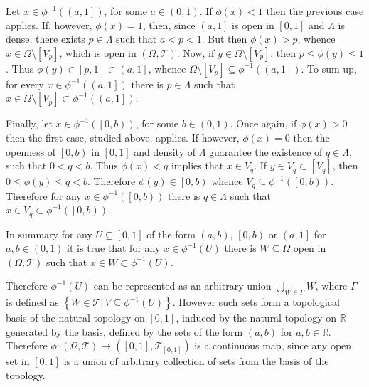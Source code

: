 \documentclass[a4paper]{article}
\newcommand{\obj}[1]{\left\{ #1 \right \}}
\newcommand{\clo}[1]{\left [ #1 \right ]}
\newcommand{\clop}[1]{\left [ #1 \right )}
\newcommand{\ploc}[1]{\left ( #1 \right ]}
\newcommand{\brac}[1]{\left ( #1 \right )}
\newcommand{\induc}[1]{\left . #1 \right \vert}
\newcommand{\Real}{\mathbb{R}}
\newcommand{\Tcal}{\mathcal{T}}
\begin{document}
Let $x\in \phi^{-1}\brac{\ploc{a,1}}$, for some $a\in \brac{0,1}$. If $\phi\brac{x}<1$ then the previous case applies. If, however, $\phi\brac{x} = 1$, then, since $\ploc{a,1}$ is open in $\clo{0,1}$ and $\Lambda$ is dense, there exists $p\in \Lambda$ such that $a < p < 1$. But then $\phi\brac{x} > p$, whence $x\in \Omega\setminus \clo{V_p}$, which is open in $\brac{\Omega, \Tcal}$. Now, if $y\in \Omega\setminus \clo{V_p}$, then $p\leq \phi\brac{y}\leq 1$. Thus $\phi\brac{y} \in \clo{p,1} \subset \ploc{a,1}$, whence $\Omega\setminus \clo{V_p}\subseteq \phi^{-1}\brac{\ploc{a,1}}$. To sum up, for every $x\in \phi^{-1}\brac{\ploc{a,1}}$ there is $p\in \Lambda$ such that $x\in \Omega\setminus \clo{V_p} \subset \phi^{-1}\brac{\ploc{a,1}}$.

Finally, let $x\in \phi^{-1}\brac{\clop{0,b}}$, for some $b\in \brac{0,1}$. Once again, if $\phi\brac{x} > 0$ then the first case, studied above, applies. If however, $\phi(x)=0$ then the openness of $\clop{0,b}$ in $\clo{0,1}$ and density of $\Lambda$ guarantee the existence of $q\in \Lambda$, such that $0 < q < b$. Thus $\phi(x) < q$ implies that $x\in V_q$. If $y\in V_q\subset \clo{V_q}$, then $0\leq \phi(y) \leq q < b$. Therefore $\phi(y) \in \clop{0,b}$ whence $V_q \subseteq \phi^{-1}\brac{\clop{0,b} }$. Therefore for any $x\in \phi^{-1}\brac{\clop{0,b}}$ there is $q\in \Lambda$ such that $x\in V_q \subset \phi^{-1}\brac{\clop{0,b}}$.

In summary for any $U\subseteq \clo{0,1}$ of the form $\brac{a,b}$, $\clop{0,b}$ or $\ploc{a,1}$ for $a,b \in \brac{0,1}$ it is true that for any $x\in \phi^{-1}\brac{U}$ there is $W\subseteq \Omega$ open in $\brac{\Omega, \Tcal}$ such that $x\in W\subset \phi^{-1}\brac{U}$.

Therefore $\phi^{-1}\brac{U}$ can be represented as an arbitrary union $\bigcup_{W\in \Gamma} W$, where $\Gamma$ is defined as $\obj{ \induc{W\in \Tcal}\, V\subseteq \phi^{-1}\brac{U}}$. However such sets form a topological basis of the natural topology on $\clo{0,1}$, induced by the natural topology on $\Real$ generated by the basis, defined by the sets of the form $\brac{a,b}$ for $a,b \in \Real$. Therefore $\phi:\brac{\Omega,\Tcal} \to \brac{\clo{0,1},\Tcal_{\clo{0,1}}}$ is a continuous map, since any open set in $\clo{0,1}$ is a union of arbitrary collection of sets from the basis of the topology.\\


\end{document}
